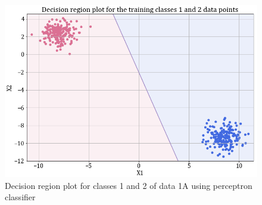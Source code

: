 \documentclass[11pt,a4paper]{article}
\begin{document}
\begin{figure}[H]
    \centering
    \includegraphics[scale=0.45]{images/1A_perceptron_training_classes_1_and_2_dec_reg.png}
    \caption{Decision region plot for classes 1 and 2 of data 1A using perceptron classifier}
    \label{fig:perc_dec_reg_12}
\end{figure}

\end{document}
